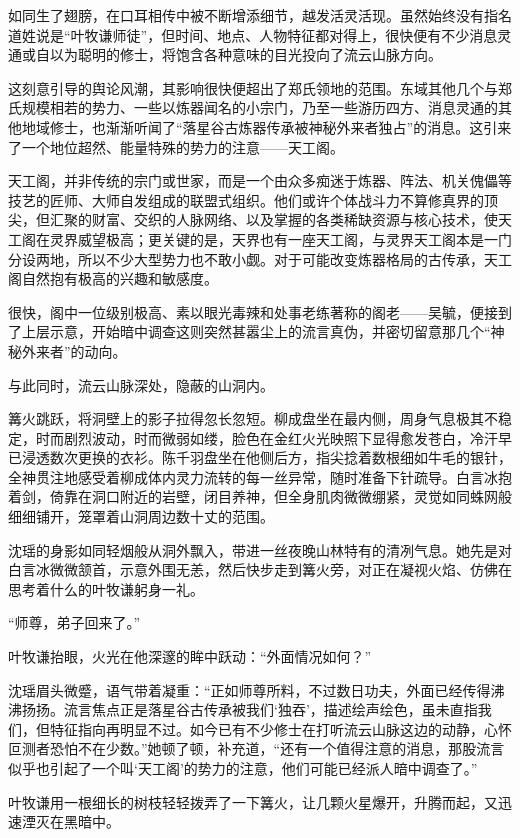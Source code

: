 如同生了翅膀，在口耳相传中被不断增添细节，越发活灵活现。虽然始终没有指名道姓说是“叶牧谦师徒”，但时间、地点、人物特征都对得上，很快便有不少消息灵通或自以为聪明的修士，将饱含各种意味的目光投向了流云山脉方向。

这刻意引导的舆论风潮，其影响很快便超出了郑氏领地的范围。东域其他几个与郑氏规模相若的势力、一些以炼器闻名的小宗门，乃至一些游历四方、消息灵通的其他地域修士，也渐渐听闻了“落星谷古炼器传承被神秘外来者独占”的消息。这引来了一个地位超然、能量特殊的势力的注意——天工阁。

天工阁，并非传统的宗门或世家，而是一个由众多痴迷于炼器、阵法、机关傀儡等技艺的匠师、大师自发组成的联盟式组织。他们或许个体战斗力不算修真界的顶尖，但汇聚的财富、交织的人脉网络、以及掌握的各类稀缺资源与核心技术，使天工阁在灵界威望极高；更关键的是，天界也有一座天工阁，与灵界天工阁本是一门分设两地，所以不少大型势力也不敢小觑。对于可能改变炼器格局的古传承，天工阁自然抱有极高的兴趣和敏感度。

很快，阁中一位级别极高、素以眼光毒辣和处事老练著称的阁老——吴毓，便接到了上层示意，开始暗中调查这则突然甚嚣尘上的流言真伪，并密切留意那几个“神秘外来者”的动向。

\vspace{2em}

与此同时，流云山脉深处，隐蔽的山洞内。

篝火跳跃，将洞壁上的影子拉得忽长忽短。柳成盘坐在最内侧，周身气息极其不稳定，时而剧烈波动，时而微弱如缕，脸色在金红火光映照下显得愈发苍白，冷汗早已浸透数次更换的衣衫。陈千羽盘坐在他侧后方，指尖捻着数根细如牛毛的银针，全神贯注地感受着柳成体内灵力流转的每一丝异常，随时准备下针疏导。白言冰抱着剑，倚靠在洞口附近的岩壁，闭目养神，但全身肌肉微微绷紧，灵觉如同蛛网般细细铺开，笼罩着山洞周边数十丈的范围。

沈瑶的身影如同轻烟般从洞外飘入，带进一丝夜晚山林特有的清冽气息。她先是对白言冰微微颔首，示意外围无恙，然后快步走到篝火旁，对正在凝视火焰、仿佛在思考着什么的叶牧谦躬身一礼。

“师尊，弟子回来了。”

叶牧谦抬眼，火光在他深邃的眸中跃动：“外面情况如何？”

沈瑶眉头微蹙，语气带着凝重：“正如师尊所料，不过数日功夫，外面已经传得沸沸扬扬。流言焦点正是落星谷古传承被我们‘独吞’，描述绘声绘色，虽未直指我们，但特征指向再明显不过。如今已有不少修士在打听流云山脉这边的动静，心怀叵测者恐怕不在少数。”她顿了顿，补充道，“还有一个值得注意的消息，那股流言似乎也引起了一个叫‘天工阁’的势力的注意，他们可能已经派人暗中调查了。”

叶牧谦用一根细长的树枝轻轻拨弄了一下篝火，让几颗火星爆开，升腾而起，又迅速湮灭在黑暗中。

